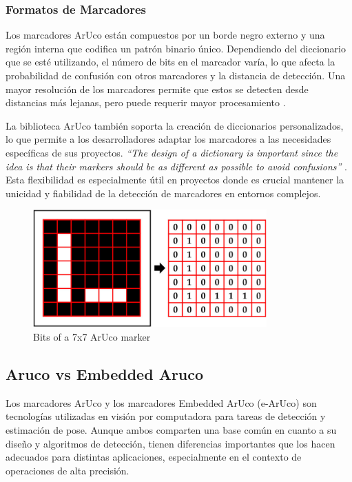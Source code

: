     \subsubsection{Formatos de Marcadores}

    Los marcadores ArUco están compuestos por un borde negro externo y una región interna que codifica un patrón binario único. Dependiendo del diccionario que se esté utilizando, el número de bits en el marcador varía, lo que afecta la probabilidad de confusión con otros marcadores y la distancia de detección. Una mayor resolución de los marcadores permite que estos se detecten desde distancias más lejanas, pero puede requerir mayor procesamiento \cite{aruco_docs}.

    La biblioteca ArUco también soporta la creación de diccionarios personalizados, lo que permite a los desarrolladores adaptar los marcadores a las necesidades específicas de sus proyectos. \textit{“The design of a dictionary is important since the idea is that their markers should be as different as possible to avoid confusions”} \cite{aruco_docs_pdf}. Esta flexibilidad es especialmente útil en proyectos donde es crucial mantener la unicidad y fiabilidad de la detección de marcadores en entornos complejos.

    \begin{figure}[h!] 
    \centering 
    \includegraphics[width=0.8\textwidth]{pictures/bits_aruco.png} %
    \caption{Bits of a 7x7 ArUco marker} 
    \label{fig} 
    \end{figure}

\subsection{Aruco vs Embedded Aruco}
    Los marcadores ArUco y los marcadores Embedded ArUco (e-ArUco) son tecnologías utilizadas en visión por computadora para tareas de detección y estimación de pose. Aunque ambos comparten una base común en cuanto a su diseño y algoritmos de detección, tienen diferencias importantes que los hacen adecuados para distintas aplicaciones, especialmente en el contexto de operaciones de alta precisión.

